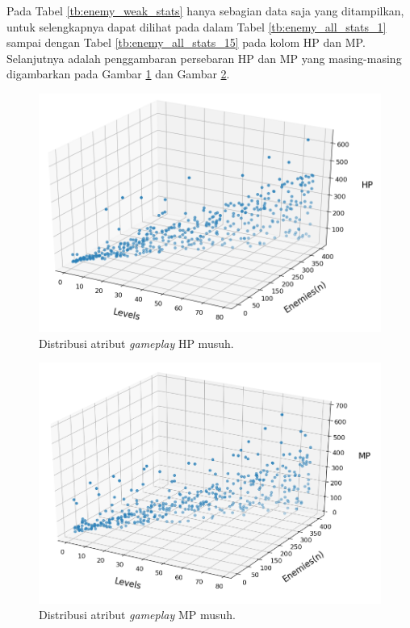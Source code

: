 Pada Tabel \ref{tb:enemy_weak_stats} hanya sebagian data saja yang ditampilkan, untuk selengkapnya dapat dilihat pada  dalam Tabel \ref{tb:enemy_all_stats_1} sampai dengan Tabel \ref{tb:enemy_all_stats_15} pada kolom HP dan MP. Selanjutnya adalah penggambaran persebaran HP dan MP yang masing-masing digambarkan pada Gambar \ref{fig:enemy_hp_distrib} dan Gambar \ref{fig:enemy_mp_distrib}.
\vspace{1ex}

\begin{figure} [!h] \centering
	\centering
	\includegraphics[scale=0.52]{img/EnemyHpDistrib.png}
	\caption{Distribusi atribut \textit{gameplay} HP musuh.}
	\label{fig:enemy_hp_distrib}
\end{figure}

\begin{figure} [!h] \centering
	\centering
	\includegraphics[scale=0.52]{img/EnemyMpDistrib.png}
	\caption{Distribusi atribut \textit{gameplay} MP musuh.}
	\label{fig:enemy_mp_distrib}
\end{figure}
\vspace{1ex}

